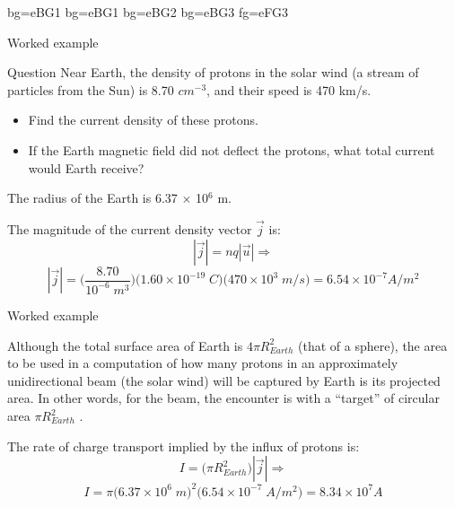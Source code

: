 %
%

{
 {bg=eBG1}
 {bg=eBG1}
 {bg=eBG2}
 {bg=eBG3}
 {fg=eFG3}

%
%
%

\begin{frame}{Worked example}

\begin{blockexmplque}{Question}
Near Earth, the density of protons in the solar wind (a stream of particles from the Sun)
is 8.70 $cm^{-3}$, and their speed is 470 km/s.
\begin{itemize}
 \item Find the current density of these protons.
 \item If the Earth magnetic field did not deflect the protons, what total current would Earth
           receive?
\end{itemize}
The radius of the Earth is 6.37 $\times$ 10$^6$ m.
\end{blockexmplque}
\vspace{0.4cm}

The magnitude of the current density vector $\vec{j}$ is:
\begin{equation*}
    |\vec{j}| = n q |\vec{u}| \Rightarrow
\end{equation*}
\begin{equation*}
    |\vec{j}| =
     \Big( \frac{8.70}{10^{-6} \; m^3} \Big)
     \Big( 1.60 \times 10^{-19}\; C \Big)
     \Big( 470 \times 10^{3} \; m/s \Big) = 6.54 \times 10^{-7} A/m^2
\end{equation*}

\end{frame}

%
%
%

\begin{frame}{Worked example}

Although the total surface area of Earth is $4\pi R_{Earth}^2$ (that of a sphere), the area to be used
in a computation of how many protons in an approximately unidirectional beam (the solar wind)
will be captured by Earth is its projected area. In other words, for the beam, the encounter is with
a ``target'' of circular area $\pi R_{Earth}^2$ . \\
\vspace{0.3cm}

The rate of charge transport implied by the influx of protons is:
\begin{equation*}
    I = \Big( \pi R_{Earth}^2 \Big) |\vec{j}| \Rightarrow
\end{equation*}
\begin{equation*}
    I = \pi \Big( 6.37 \times 10^{6}\; m \Big)^2
               \Big( 6.54 \times 10^{-7}\; A/m^2 \Big) = 8.34 \times 10^{7} A
\end{equation*}


\end{frame}


} %



